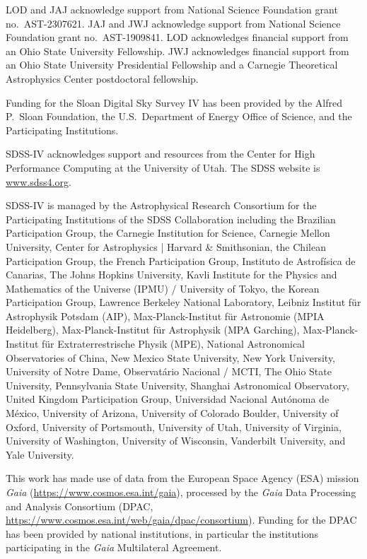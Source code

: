 \documentclass[twocolumn,twocolappendix]{aastex631}
\begin{document}
LOD and JAJ acknowledge support from National Science Foundation grant no.\ AST-2307621. JAJ and JWJ acknowledge support from National Science Foundation grant no.\ AST-1909841.
LOD acknowledges financial support from an Ohio State University Fellowship.
JWJ acknowledges financial support from an Ohio State University Presidential Fellowship and a Carnegie Theoretical Astrophysics Center postdoctoral fellowship.

Funding for the Sloan Digital Sky 
Survey IV has been provided by the 
Alfred P.\ Sloan Foundation, the U.S.\ 
Department of Energy Office of 
Science, and the Participating 
Institutions. 

SDSS-IV acknowledges support and 
resources from the Center for High 
Performance Computing  at the 
University of Utah. The SDSS 
website is \url{www.sdss4.org}.

SDSS-IV is managed by the 
Astrophysical Research Consortium 
for the Participating Institutions 
of the SDSS Collaboration including 
the Brazilian Participation Group, 
the Carnegie Institution for Science, 
Carnegie Mellon University, Center for 
Astrophysics | Harvard \& 
Smithsonian, the Chilean Participation 
Group, the French Participation Group, 
Instituto de Astrof\'isica de 
Canarias, The Johns Hopkins 
University, Kavli Institute for the 
Physics and Mathematics of the 
Universe (IPMU) / University of 
Tokyo, the Korean Participation Group, 
Lawrence Berkeley National Laboratory, 
Leibniz Institut f\"ur Astrophysik 
Potsdam (AIP),  Max-Planck-Institut 
f\"ur Astronomie (MPIA Heidelberg), 
Max-Planck-Institut f\"ur 
Astrophysik (MPA Garching), 
Max-Planck-Institut f\"ur 
Extraterrestrische Physik (MPE), 
National Astronomical Observatories of 
China, New Mexico State University, 
New York University, University of 
Notre Dame, Observat\'ario 
Nacional / MCTI, The Ohio State 
University, Pennsylvania State 
University, Shanghai 
Astronomical Observatory, United 
Kingdom Participation Group, 
Universidad Nacional Aut\'onoma 
de M\'exico, University of Arizona, 
University of Colorado Boulder, 
University of Oxford, University of 
Portsmouth, University of Utah, 
University of Virginia, University 
of Washington, University of 
Wisconsin, Vanderbilt University, 
and Yale University.

This work has made use of data from the European Space Agency (ESA) mission
{\it Gaia} (\url{https://www.cosmos.esa.int/gaia}), processed by the {\it Gaia}
Data Processing and Analysis Consortium (DPAC,
\url{https://www.cosmos.esa.int/web/gaia/dpac/consortium}). Funding for the DPAC
has been provided by national institutions, in particular the institutions
participating in the {\it Gaia} Multilateral Agreement.
\end{document}
